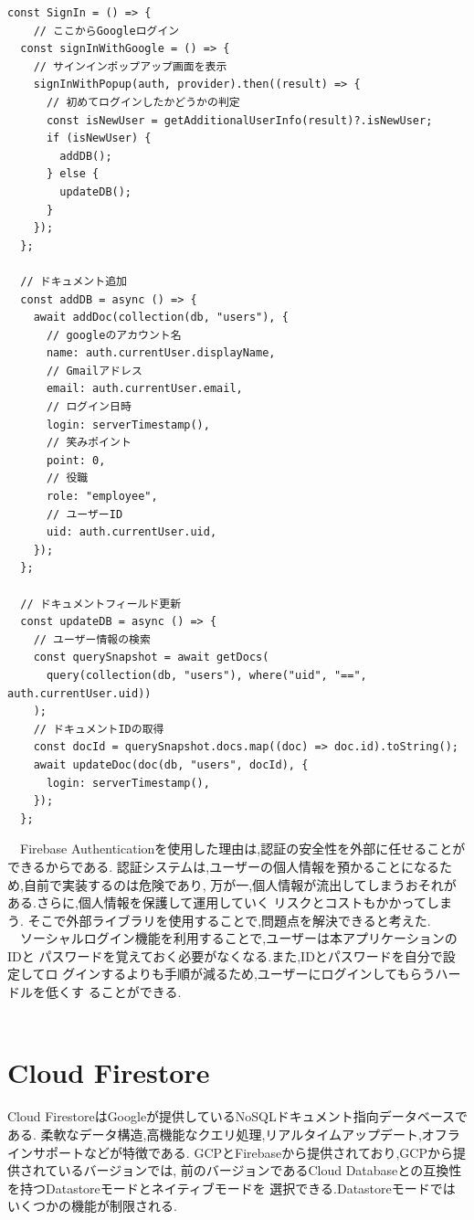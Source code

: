 \begin{lstlisting}[caption=Googleログインの実装]
  const SignIn = () => {
    // ここからGoogleログイン
  const signInWithGoogle = () => {
    // サインインポップアップ画面を表示
    signInWithPopup(auth, provider).then((result) => {
      // 初めてログインしたかどうかの判定
      const isNewUser = getAdditionalUserInfo(result)?.isNewUser;
      if (isNewUser) {
        addDB();
      } else {
        updateDB();
      }
    });
  };

  // ドキュメント追加
  const addDB = async () => {
    await addDoc(collection(db, "users"), {
      // googleのアカウント名
      name: auth.currentUser.displayName,
      // Gmailアドレス
      email: auth.currentUser.email,
      // ログイン日時
      login: serverTimestamp(),
      // 笑みポイント
      point: 0,
      // 役職
      role: "employee",
      // ユーザーID
      uid: auth.currentUser.uid,
    });
  };

  // ドキュメントフィールド更新
  const updateDB = async () => {
    // ユーザー情報の検索
    const querySnapshot = await getDocs(
      query(collection(db, "users"), where("uid", "==", auth.currentUser.uid))
    );
    // ドキュメントIDの取得
    const docId = querySnapshot.docs.map((doc) => doc.id).toString();
    await updateDoc(doc(db, "users", docId), {
      login: serverTimestamp(),
    });
  };
\end{lstlisting}

\vspace{12mm}

　Firebase Authenticationを使用した理由は,認証の安全性を外部に任せることができるからである.
認証システムは,ユーザーの個人情報を預かることになるため,自前で実装するのは危険であり,
万が一,個人情報が流出してしまうおそれがある.さらに,個人情報を保護して運用していく
リスクとコストもかかってしまう.
そこで外部ライブラリを使用することで,問題点を解決できると考えた. \\
　ソーシャルログイン機能を利用することで,ユーザーは本アプリケーションのIDと
パスワードを覚えておく必要がなくなる.また,IDとパスワードを自分で設定してロ
グインするよりも手順が減るため,ユーザーにログインしてもらうハードルを低くす
ることができる. \\
　

\section{Cloud Firestore}
\label{sec:reference_cloud}
Cloud FirestoreはGoogleが提供しているNoSQLドキュメント指向データベースである.
柔軟なデータ構造,高機能なクエリ処理,リアルタイムアップデート,オフラインサポートなどが特徴である.
GCPとFirebaseから提供されており,GCPから提供されているバージョンでは,
前のバージョンであるCloud Databaseとの互換性を持つDatastoreモードとネイティブモードを
選択できる.Datastoreモードではいくつかの機能が制限される. \\

